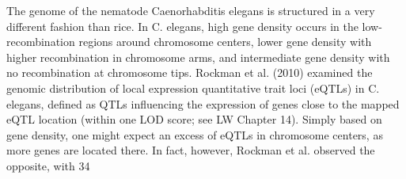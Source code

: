 \documentclass{article}
\begin{document}
The genome of the nematode Caenorhabditis elegans is structured in a very different fashion than rice. In C. elegans, high gene density occurs in the low-recombination regions around chromosome centers, lower gene density with higher recombination in chromosome arms, and intermediate gene density with no recombination at chromosome tips. Rockman et al. (2010) examined the genomic distribution of local expression quantitative trait loci (eQTLs) in C. elegans, defined as QTLs influencing the expression of genes close to the mapped eQTL location (within one LOD score; see LW Chapter 14). Simply based on gene density, one might expect an excess of eQTLs in chromosome centers, as more genes are located there. In fact, however, Rockman et al. observed the opposite, with 34%
\end{document}
